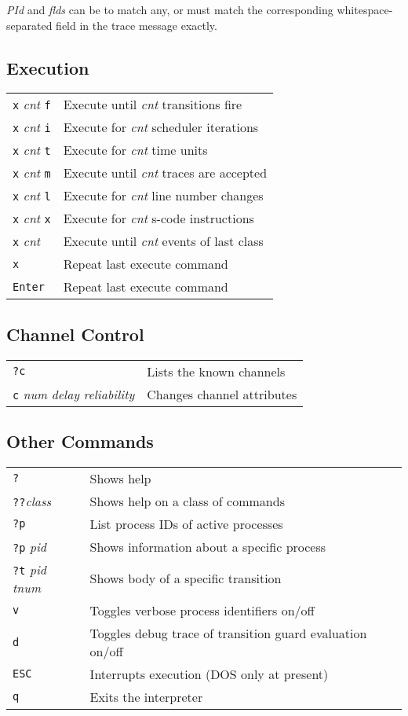 {\em PId} and {\em flds} can be {\tt *} to match any, or must
match the corresponding whitespace-separated field in the trace
message exactly.

\subsection{Execution}

\begin{tabular}{ll}
{\tt x} {\em cnt} {\tt f} & Execute until {\em cnt} transitions fire\\
{\tt x} {\em cnt} {\tt i} & Execute for {\em cnt} scheduler iterations\\
{\tt x} {\em cnt} {\tt t} & Execute for {\em cnt} time units\\
{\tt x} {\em cnt} {\tt m} & Execute until {\em cnt} traces are accepted\\
{\tt x} {\em cnt} {\tt l} & Execute for {\em cnt} line number changes\\
{\tt x} {\em cnt} {\tt x} & Execute for {\em cnt} s-code instructions\\
{\tt x} {\em cnt} & Execute until {\em cnt} events of last class\\
{\tt x} & Repeat last execute command\\
{\tt Enter} & Repeat last execute command\\
\end{tabular}

\subsection{Channel Control}

\begin{tabular}{ll}
{\tt ?c} & Lists the known channels\\
{\tt c} {\em num} {\em delay} {\em reliability} & Changes channel attributes\\
\end{tabular}

\subsection{Other Commands}

\begin{tabular}{ll}
{\tt ?} & Shows help\\
{\tt ??}{\em class} & Shows help on a class of commands\\
{\tt ?p} & List process IDs of active processes\\
{\tt ?p} {\em pid} & Shows information about a specific process\\
{\tt ?t} {\em pid} {\em tnum}& Shows body of a specific transition\\
{\tt v} & Toggles verbose process identifiers on/off\\
{\tt d} & Toggles debug trace of transition guard evaluation on/off\\
{\tt ESC} & Interrupts execution (DOS only at present)\\
{\tt q} & Exits the interpreter\\
\end{tabular}


